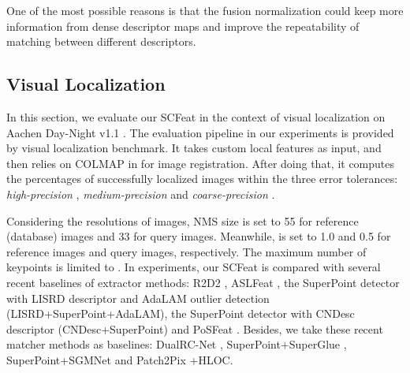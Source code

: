 \documentclass[journal]{IEEEtran}
\begin{document}
One of the most possible reasons is that the fusion normalization could keep more information from dense descriptor maps and improve the repeatability of matching between different descriptors.

\subsection{Visual Localization} \label{vl}

















In this section, we evaluate our SCFeat in the context of visual localization on Aachen Day-Night v1.1 \cite{aachen}. The evaluation pipeline in our experiments is provided by visual localization benchmark. It takes custom local features as input, and then relies on COLMAP in \cite{schoenberger2016sfm,schoenberger2016mvs} for image registration. After doing that, it computes the percentages of successfully localized images within the three error tolerances: \emph{high-precision} , \emph{medium-precision}  and \emph{coarse-precision} .

Considering the resolutions of images, NMS size  is set to 55 for reference (database) images and 33 for query images. Meanwhile,  is set to 1.0 and 0.5 for reference images and query images, respectively. The maximum number of keypoints is limited to . 
In experiments, our SCFeat is compared with several recent baselines of extractor methods: R2D2 \cite{R2D2}, ASLFeat \cite{aslfeat}, the SuperPoint detector \cite{SuperPoint} with LISRD descriptor \cite{LISRD} and AdaLAM outlier detection \cite{cavalli2020handcrafted} (LISRD+SuperPoint+AdaLAM), the SuperPoint detector with CNDesc descriptor \cite{cndesc} (CNDesc+SuperPoint) and PoSFeat \cite{li2022decoupling}. Besides, we take these recent matcher methods as baselines: DualRC-Net \cite{DualRC-Net}, SuperPoint+SuperGlue \cite{SuperGlue}, SuperPoint+SGMNet \cite{sgmnet} and Patch2Pix \cite{Patch2Pix}+HLOC\cite{HLOC}.
\end{document}
